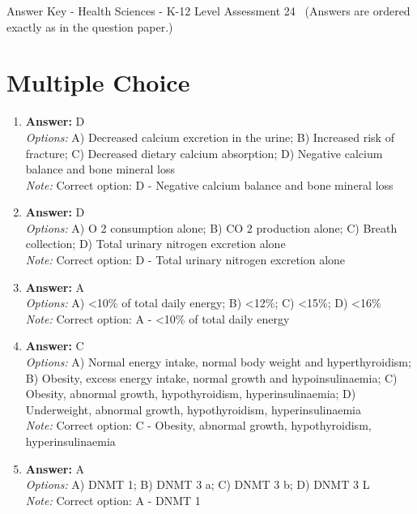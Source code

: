 \documentclass[12pt]{article}
\begin{document}
\begin{center}
Answer Key - Health Sciences - K-12 Level Assessment 24 \
\small (Answers are ordered exactly as in the question paper.)
\end{center}

\section*{Multiple Choice}
\begin{enumerate}[label=\arabic*.]
\item \textbf{Answer:} D
\\ \textit{Options:} A) Decreased calcium excretion in the urine; B) Increased risk of fracture; C) Decreased dietary calcium absorption; D) Negative calcium balance and bone mineral loss
\\ \textit{Note:} Correct option: D - Negative calcium balance and bone mineral loss
\item \textbf{Answer:} D
\\ \textit{Options:} A) O 2 consumption alone; B) CO 2 production alone; C) Breath collection; D) Total urinary nitrogen excretion alone
\\ \textit{Note:} Correct option: D - Total urinary nitrogen excretion alone
\item \textbf{Answer:} A
\\ \textit{Options:} A) \textless{}10\% of total daily energy; B) \textless{}12\%; C) \textless{}15\%; D) \textless{}16\%
\\ \textit{Note:} Correct option: A - \textless{}10\% of total daily energy
\item \textbf{Answer:} C
\\ \textit{Options:} A) Normal energy intake, normal body weight and hyperthyroidism; B) Obesity, excess energy intake, normal growth and hypoinsulinaemia; C) Obesity, abnormal growth, hypothyroidism, hyperinsulinaemia; D) Underweight, abnormal growth, hypothyroidism, hyperinsulinaemia
\\ \textit{Note:} Correct option: C - Obesity, abnormal growth, hypothyroidism, hyperinsulinaemia
\item \textbf{Answer:} A
\\ \textit{Options:} A) DNMT 1; B) DNMT 3 a; C) DNMT 3 b; D) DNMT 3 L
\\ \textit{Note:} Correct option: A - DNMT 1
\end{enumerate}
\end{document}
